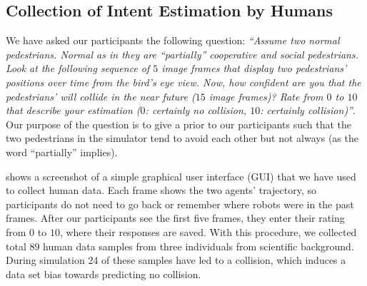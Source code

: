 \subsection{Collection of Intent Estimation by Humans}
We have asked our participants the following question: \textit{``Assume two normal pedestrians. Normal as in they are ``partially'' cooperative and social pedestrians. Look at the following sequence of $5$ image frames that display two pedestrians' positions over time from the bird's eye view.
Now, how confident are you that the pedestrians' will collide in the near future ($15$ image frames)? Rate from $0$ to $10$ that describe your estimation ($0$: certainly no collision, $10$: certainly collision)''}. 
Our purpose of the question is to give a prior to our participants such that the two pedestrians in the simulator tend to avoid each other but not always (as the word ``partially'' implies). 

 shows a screenshot of a simple graphical user interface (GUI) that we have used to collect human data.
Each frame shows the two agents' trajectory, so participants do not need to go back or remember where robots were in the past frames. 
After our participants see the first five frames, they enter their rating from $0$ to $10$, where their responses are saved. 
With this procedure, we collected total $89$ human data samples from three individuals from scientific background. During simulation 24 of these samples have led to a collision, which induces a data set bias towards predicting no collision.
\\
